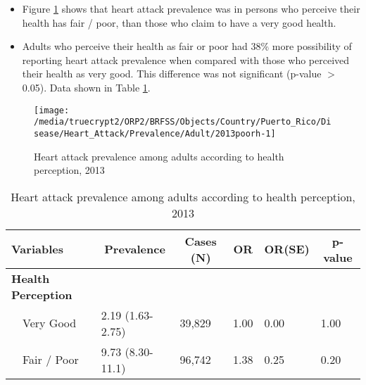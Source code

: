  \begin{itemize}

\item Figure \ref{fig:fairpoor.Heart_Attack.2013} shows that heart attack prevalence  was 
 in persons who perceive their health has fair / poor,
than those who claim to have a very good health.

\item Adults who perceive their health as fair or poor had 38\% more possibility of reporting heart attack prevalence when compared with those who perceived their health as very good. This difference was not significant (p-value $>$ 0.05). Data shown in Table \ref{tab:fairpoor.Heart_Attack.2013}.

\end{itemize}

\begin{figure}[H]
\caption{Heart attack prevalence among adults according to health perception,
         2013}
\label{fig:fairpoor.Heart_Attack.2013}

\begin{knitrout}
\color{fgcolor}

{\centering \texttt{[image: /media/truecrypt2/ORP2/BRFSS/Objects/Country/Puerto\_Rico/Disease/Heart\_Attack/Prevalence/Adult/2013poorh-1]} 

}



\end{knitrout}
 \end{figure}

\begin{table}[H]
\caption{Heart attack prevalence  among adults according to health perception, 2013\label{tab:fairpoor.Heart_Attack.2013}} 
\begin{center}
\begin{tabular}{llllll}
\hline\hline
\multicolumn{1}{l}{Variables}&\multicolumn{1}{c}{Prevalence}&\multicolumn{1}{c}{Cases (N)}&\multicolumn{1}{c}{OR}&\multicolumn{1}{c}{OR(SE)}&\multicolumn{1}{c}{p-value}\tabularnewline
\hline
{\bfseries Health Perception}&&&&&\tabularnewline
~~Very Good&2.19 (1.63-2.75)&39,829&1.00&0.00&1.00\tabularnewline
~~Fair / Poor&9.73 (8.30-11.1)&96,742&1.38&0.25&0.20\tabularnewline
\hline
\end{tabular}\end{center}

\end{table}

